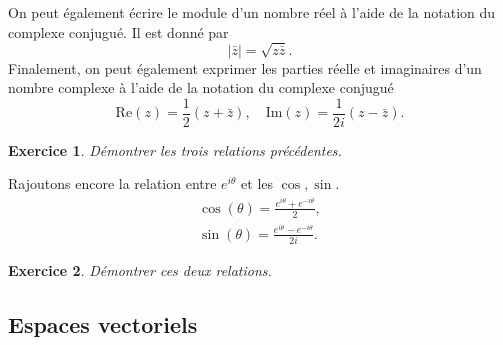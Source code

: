 \documentclass[a4paper,12pt]{book}
\newcommand{\zbar}{\bar{z}}
\renewcommand{\Re}{\mathrm{Re}}
\renewcommand{\Im}{\mathrm{Im}}
\newtheorem*{exercice}{Exercice}
\begin{document}
On peut également écrire le module d'un nombre réel à l'aide de la notation 
du complexe conjugué. Il est donné par 
\begin{equation}
 |\zbar|=\sqrt{z\zbar}.
\end{equation}
Finalement, on peut également exprimer les parties réelle et imaginaires d'un nombre complexe à l'aide 
de la notation du complexe conjugué
\begin{equation}
 \Re(z)=\frac{1}{2}(z+\zbar),\quad \Im(z)=\frac{1}{2i}(z-\zbar).
\end{equation}
\begin{exercice}
Démontrer les trois relations précédentes.
\end{exercice}
Rajoutons encore la relation entre $e^{i\theta}$ et les $\cos,\sin$. 
\begin{align}
 \cos(\theta)=\frac{e^{i\theta}+e^{-i\theta}}{2},\\
 \sin(\theta)=\frac{e^{i\theta}-e^{-i\theta}}{2i}.
\end{align}
\begin{exercice}
Démontrer ces deux relations.
\end{exercice}

\subsection{Espaces vectoriels}
\end{document}
